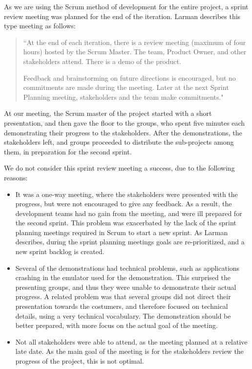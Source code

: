 As we are using the Scrum method of development for the entire \giraf project, a sprint review meeting was planned for the end of the iteration. 
Larman \cite[p. 71]{larmanAgile} describes this type meeting as follows:
\begin{quote}
``At the end of each iteration, there is a review meeting (maximum of four hours)
hosted by the Scrum Master.
The team, Product Owner, and other stakeholders attend.
There is a demo of the product.

Feedback and brainstorming on future directions is encouraged, but no commitments are made during the meeting.
Later at the next Sprint Planning meeting, stakeholders and the team make commitments."
\end{quote}

At our meeting, the Scrum master of the \giraf project started with a short presentation, and then gave the floor to the groups, who spent five minutes each demonstrating their progress to the stakeholders. 
After the demonstrations, the stakeholders left, and groups proceeded to distribute the sub-projects among them, in preparation for the second sprint.

We do not consider this sprint review meeting a success, due to the following reasons:
\begin{itemize}
	\item It was a one-way meeting, where the stakeholders were presented with the progress, but were not encouraged to give any feedback. As a result, the development teams had no gain from the meeting, and were ill prepared for the second sprint. This problem was exacerbated by the lack of the sprint planning meetings required in Scrum to start a new sprint. As Larman \cite[p. 70]{larmanAgile} describes, during the sprint planning meetings goals are re-prioritized, and a new sprint backlog is created. 
	\item Several of the demonstrations had technical problems, such as applications crashing in the emulator used for the demonstration. This surprised the presenting groups, and thus they were unable to demonstrate their actual progress. A related problem was that several groups did not direct their presentation towards the costumers, and therefore focused on technical details, using a very technical vocabulary. The demonstration should be better prepared, with more focus on the actual goal of the meeting.
	\item Not all stakeholders were able to attend, as the meeting planned at a relative late date. As the main goal of the meeting is for the stakeholders review the progress of the project, this is not optimal.
\end{itemize}

